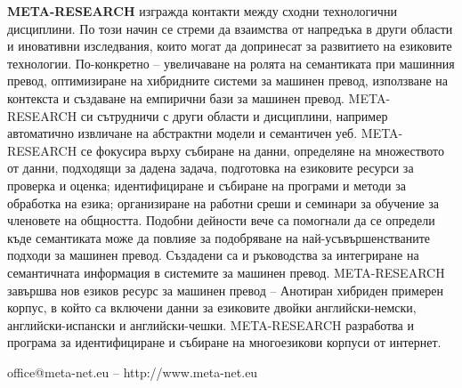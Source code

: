 \documentclass[]{../../metanetpaper}
\begin{document}
\begin{multicols}{2}
\textbf{META-RESEARCH} изгражда контакти между сходни технологични
дисциплини. По този начин се стреми да взаимства от напредъка в други
области и иновативни изследвания, които могат да допринесат за
развитието на езиковите технологии.  По-конкретно -- увеличаване на
ролята на семантиката при машинния превод, оптимизиране на хибридните
системи за машинен превод, използване на контекста и създаване на
емпирични бази за машинен превод. META-RESEARCH си сътрудничи с други
области и дисциплини, например автоматично извличане на абстрактни
модели и семантичен уеб.  META-RESEARCH се фокусира върху събиране на
данни, определяне на множеството от данни, подходящи за дадена задача,
подготовка на езиковите ресурси за проверка и оценка; идентифициране и
събиране на програми и методи за обработка на езика; организиране на
работни среши и семинари за обучение за членовете на
общността. Подобни дейности вече са помогнали да се определи къде
семантиката може да повлияе за подобряване на най-усъвършенстваните
подходи за машинен превод. Създадени са и ръководства за интегриране
на семантичната информация в системите за машинен
превод. META-RESEARCH завършва нов езиков ресурс за машинен превод –
Анотиран хибриден примерен корпус, в който са включени данни за
езиковите двойки английски-немски, английски-испански и
английски-чешки.  META-RESEARCH разработва и програма за
идентифициране и събиране на многоезикови корпуси от интернет.
\end{multicols}

\vfill
\centerline{office@meta-net.eu -- http://www.meta-net.eu}


\setcounter{section}{0}
\setcounter{figure}{0}

\cleardoublepage


\end{document}
